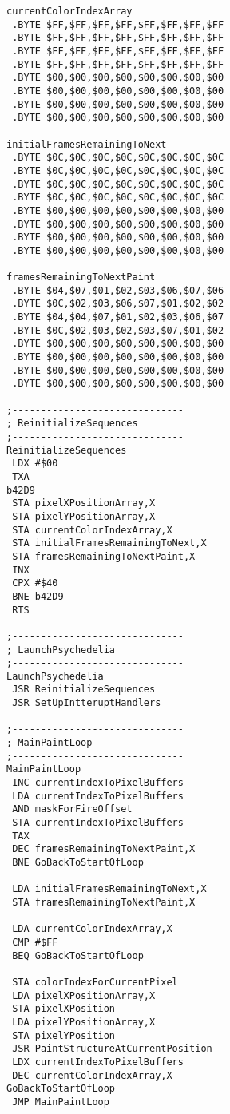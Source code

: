 \clearpage
\begin{minipage}[b]{0.33\linewidth}
\begin{lrbox}{\mybox}%
\begin{lstlisting}[basicstyle=\ttfamily\tiny]
currentColorIndexArray   
 .BYTE $FF,$FF,$FF,$FF,$FF,$FF,$FF,$FF
 .BYTE $FF,$FF,$FF,$FF,$FF,$FF,$FF,$FF
 .BYTE $FF,$FF,$FF,$FF,$FF,$FF,$FF,$FF
 .BYTE $FF,$FF,$FF,$FF,$FF,$FF,$FF,$FF
 .BYTE $00,$00,$00,$00,$00,$00,$00,$00
 .BYTE $00,$00,$00,$00,$00,$00,$00,$00
 .BYTE $00,$00,$00,$00,$00,$00,$00,$00
 .BYTE $00,$00,$00,$00,$00,$00,$00,$00

initialFramesRemainingToNext   
 .BYTE $0C,$0C,$0C,$0C,$0C,$0C,$0C,$0C
 .BYTE $0C,$0C,$0C,$0C,$0C,$0C,$0C,$0C
 .BYTE $0C,$0C,$0C,$0C,$0C,$0C,$0C,$0C
 .BYTE $0C,$0C,$0C,$0C,$0C,$0C,$0C,$0C
 .BYTE $00,$00,$00,$00,$00,$00,$00,$00
 .BYTE $00,$00,$00,$00,$00,$00,$00,$00
 .BYTE $00,$00,$00,$00,$00,$00,$00,$00
 .BYTE $00,$00,$00,$00,$00,$00,$00,$00

framesRemainingToNextPaint   
 .BYTE $04,$07,$01,$02,$03,$06,$07,$06
 .BYTE $0C,$02,$03,$06,$07,$01,$02,$02
 .BYTE $04,$04,$07,$01,$02,$03,$06,$07
 .BYTE $0C,$02,$03,$02,$03,$07,$01,$02
 .BYTE $00,$00,$00,$00,$00,$00,$00,$00
 .BYTE $00,$00,$00,$00,$00,$00,$00,$00
 .BYTE $00,$00,$00,$00,$00,$00,$00,$00
 .BYTE $00,$00,$00,$00,$00,$00,$00,$00

;------------------------------
; ReinitializeSequences
;------------------------------
ReinitializeSequences   
 LDX #$00
 TXA 
b42D9   
 STA pixelXPositionArray,X
 STA pixelYPositionArray,X
 STA currentColorIndexArray,X
 STA initialFramesRemainingToNext,X
 STA framesRemainingToNextPaint,X
 INX 
 CPX #$40
 BNE b42D9
 RTS 

;------------------------------
; LaunchPsychedelia
;------------------------------
LaunchPsychedelia   
 JSR ReinitializeSequences
 JSR SetUpIntteruptHandlers

;------------------------------
; MainPaintLoop
;------------------------------
MainPaintLoop   
 INC currentIndexToPixelBuffers
 LDA currentIndexToPixelBuffers
 AND maskForFireOffset
 STA currentIndexToPixelBuffers
 TAX 
 DEC framesRemainingToNextPaint,X
 BNE GoBackToStartOfLoop

 LDA initialFramesRemainingToNext,X
 STA framesRemainingToNextPaint,X

 LDA currentColorIndexArray,X
 CMP #$FF
 BEQ GoBackToStartOfLoop

 STA colorIndexForCurrentPixel
 LDA pixelXPositionArray,X
 STA pixelXPosition
 LDA pixelYPositionArray,X
 STA pixelYPosition
 JSR PaintStructureAtCurrentPosition
 LDX currentIndexToPixelBuffers
 DEC currentColorIndexArray,X
GoBackToStartOfLoop   
 JMP MainPaintLoop


\end{lstlisting}
\end{lrbox}
\end{minipage}
